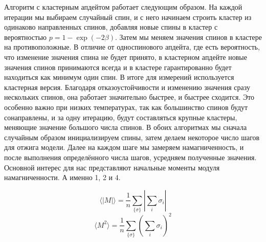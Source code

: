 Алгоритм с кластерным апдейтом работает следующим образом. На каждой итерации мы выбираем случайный спин, и с него начинаем строить кластер из одинаково направленных спинов, добавляя новые спины в кластер с вероятностью $p = 1 - \exp(-2\beta)$. Затем мы меняем значения спинов в кластере на противоположные. В отличие от односпинового апдейта, где есть вероятность, что изменение значения спина не будет принято, в кластерном апдейте новые значения спинов принимаются всегда и в кластере гарантированно будет находиться как минимум один спин.
В итоге для измерений используется кластерная версия. Благодаря отказоустойчивости и изменению значения сразу нескольких спинов, она работает значительно быстрее, и быстрее сходится. Это особенно важно при низких температурах, так как большинство спинов будут сонаправлены, и за одну итерацию, будут составляться крупные кластеры, меняющие значение большого числа спинов. 
В обоих алгоритмах мы сначала случайным образом инициализируем спины, затем делаем некоторое число шагов для отжига модели. Далее на каждом шаге мы замеряем намагниченность, и после выполнения определённого числа шагов, усредняем полученные значения. Основной интерес для нас представляют начальные моменты модуля намагниченности. А именно 1, 2 и 4.

\[
\langle |M|\rangle = \frac{1}{n} \sum_{\{\sigma\}} \left| \sum_i \sigma_i \right|
\]
\[
\langle M^2\rangle = \frac{1}{n} \sum_{\{\sigma\}} \left( \sum_i \sigma_i \right)^2
\]